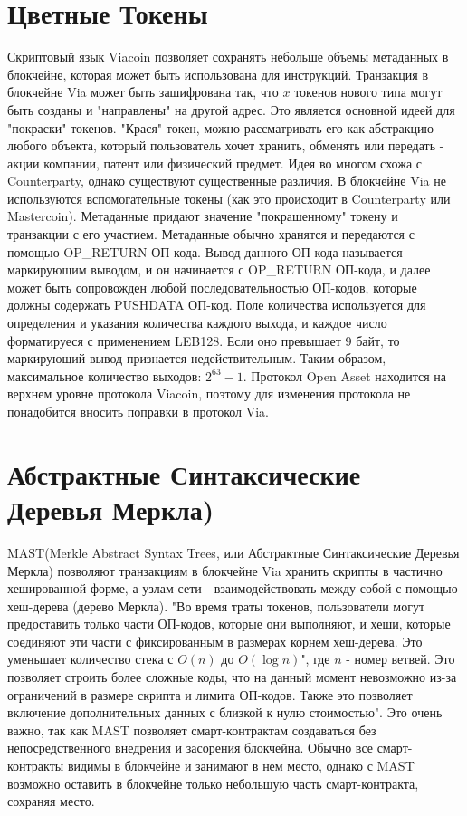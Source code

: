 \documentclass{article}
\begin{document}
\section{Цветные Токены}\label{Colored coins}
Скриптовый язык Viacoin позволяет сохранять небольше объемы метаданных в блокчейне, которая может быть использована для инструкций. Транзакция в блокчейне Via может быть зашифрована так, что $x$ токенов нового типа могут быть созданы и "направлены" на другой адрес. Это является основной идеей для "покраски" токенов.
"Крася" токен, можно рассматривать его как абстракцию любого объекта, который пользователь хочет хранить, обменять или передать - акции компании, патент или физический предмет. Идея во многом схожа с Counterparty, однако существуют существенные различия.
\newline \newline \noindent
В блокчейне Via не используются вспомогательные токены (как это происходит в Counterparty или Mastercoin). Метаданные придают значение "покрашенному" токену \cite{coloredCoins} и транзакции с его участием. Метаданные обычно хранятся и передаются с помощью OP\_RETURN ОП-кода. Вывод данного ОП-кода называется маркирующим выводом, и он начинается с OP\_RETURN ОП-кода, и далее может быть сопровожден любой последовательностью ОП-кодов, которые должны содержать PUSHDATA ОП-код.
Поле количества используется для определения и указания количества каждого выхода, и каждое число форматируеся с применением LEB128. Если оно превышает 9 байт, то маркирующий вывод признается недействительным. Таким образом, максимальное количество выходов: $2^{63} - 1$.
Протокол \cite{openAsset} Open Asset находится на верхнем уровне протокола Viacoin, поэтому для изменения протокола не понадобится вносить поправки в протокол Via.

\section{Абстрактные Синтаксические Деревья Меркла)} \label{MAST (Merkelized Abstract Syntax Trees)}
\cite{MAST} MAST(Merkle Abstract Syntax Trees, или Абстрактные Синтаксические Деревья Меркла) позволяют транзакциям в блокчейне Via хранить скрипты в частично хешированной форме, а узлам сети - взаимодействовать между собой с помощью хеш-дерева (дерево Меркла).
"Во время траты токенов, пользователи могут предоставить только части ОП-кодов, которые они выполняют, и хеши, которые соединяют эти части с фиксированным в размерах корнем хеш-дерева. Это уменьшает количество стека с $O(n)$ до $O(\log{}n)$", где $n$ - номер ветвей. Это позволяет строить более сложные коды, что на данный момент невозможно из-за ограничений в размере скрипта и лимита ОП-кодов. Также это позволяет включение дополнительных данных с близкой к нулю стоимостью".  \newline \newline \noindent
Это очень важно, так как MAST позволяет смарт-контрактам создаваться без непосредственного внедрения и засорения блокчейна. Обычно все смарт-контракты видимы в блокчейне и занимают в нем место, однако с MAST возможно оставить в блокчейне только небольшую часть смарт-контракта, сохраняя место.
\end{document}
